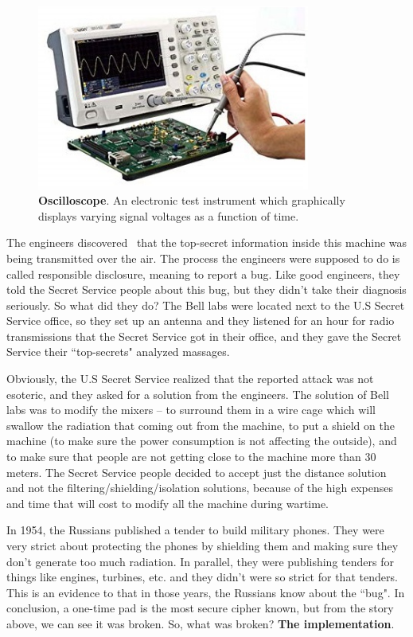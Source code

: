\begin{figure}
    \centering
    \includegraphics[width=0.8\textwidth]{images/ch1_Intro/oscilloscope.jpg}
    \caption{\textbf{Oscilloscope}. An electronic test instrument which graphically displays varying signal voltages as a function of time.}
    \label{fig:Oscillo}
\end{figure}

The engineers discovered~\cite{NSAsecret} that the top-secret information inside this machine was being transmitted over the air. The process the engineers were supposed to do is called responsible disclosure, meaning to report a bug. Like good engineers, they told the Secret Service people about this bug, but they didn't take their diagnosis seriously. So what did they do? The Bell labs were located next to the U.S Secret Service office, so they set up an antenna and they listened for an hour for radio transmissions that the Secret Service got in their office, and they gave the Secret Service their ``top-secrets" analyzed massages.

Obviously, the U.S Secret Service realized that the reported attack was not esoteric, and they asked for a solution from the engineers. The solution of Bell labs was to modify the mixers – to surround them in a wire cage which will swallow the radiation that coming out from the machine, to put a shield on the machine (to make sure the power consumption is not affecting the outside), and to make sure that people are not getting close to the machine more than 30 meters. The Secret Service people decided to accept just the distance solution and not the filtering/shielding/isolation solutions, because of the high expenses and time that will cost to modify all the machine during wartime.

In 1954, the Russians published a tender to build military phones. They were very strict about protecting the phones by shielding them and making sure they don't generate too much radiation. In parallel, they were publishing tenders for things like engines, turbines, etc. and they didn't were so strict for that tenders. This is an evidence to that in those years, the Russians know about the ``bug".
In conclusion, a one-time pad is the most secure cipher known, but from the story above, we can see it was broken. So, what was broken? \textbf{The implementation}.


